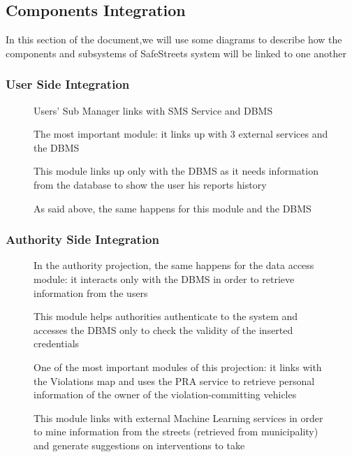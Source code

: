 \documentclass[12pt,a4paper]{article}
\begin{document}
\subsection{Components Integration}
In this section of the document,we will use some diagrams to describe how the components and subsystems of SafeStreets system will be linked to one another
\subsubsection{User Side Integration}
\begin{figure}[H]
		\centering

		\caption{Users' Sub Manager links with SMS Service and DBMS}
\end{figure}
\begin{figure}[H]
		\centering

		\caption{The most important module: it links up with 3 external services and the DBMS}
\end{figure}
\begin{figure}[H]
		\centering

		\caption{This module links up only with the DBMS as it needs information from the database to show the user his reports history}
\end{figure}
\begin{figure}[H]
		\centering

		\caption{As said above, the same happens for this module and the DBMS}
\end{figure}
\subsubsection{Authority Side Integration}
\begin{figure}[H]
		\centering

		\caption{In the authority projection, the same happens for the data access module: it interacts only with the DBMS in order to retrieve information from the users}
\end{figure}
\begin{figure}[H]
		\centering

		\caption{This module helps authorities authenticate to the system and accesses the DBMS only to check the validity of the inserted credentials}
\end{figure}
\begin{figure}[H]
		\centering

		\caption{One of the most important modules of this projection: it links with the Violations map and uses the PRA service to retrieve personal information of the owner of the violation-committing vehicles}
\end{figure}
\begin{figure}[H]
		\centering

		\caption{This module links with external Machine Learning services in order to mine information from the streets (retrieved from municipality) and generate suggestions on interventions to take}
\end{figure}
\end{document}
